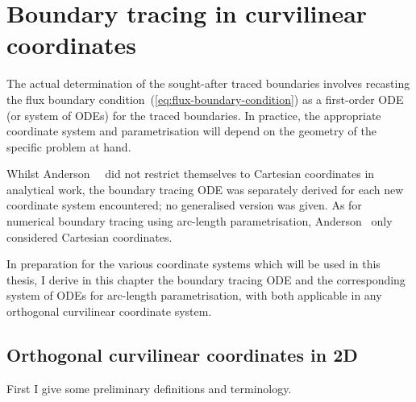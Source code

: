\chapter{Boundary tracing in curvilinear coordinates}
\label{ch:curvilinear}

The actual determination of the sought-after traced boundaries involves
recasting the flux boundary condition~(\ref{eq:flux-boundary-condition})
as a first-order ODE (or system of ODEs) for the traced boundaries.
In practice, the appropriate coordinate system and parametrisation
will depend on the geometry of the specific problem at hand.

Whilst Anderson~\etal~\cite{%
  anderson-2007-boundary-tracing-i-theory,%
  anderson-2007-boundary-tracing-ii-applications%
}
did not restrict themselves to Cartesian coordinates in analytical work,
the boundary tracing ODE was separately derived
for each new coordinate system encountered;
no generalised version was given.
As for numerical boundary tracing using arc-length parametrisation,
Anderson~\cite{anderson-2002-thesis-boundary-tracing-pdes}
only considered Cartesian coordinates.

In preparation for the various coordinate systems
which will be used in this thesis,
I derive in this chapter the boundary tracing ODE
and the corresponding system of ODEs for arc-length parametrisation,
with both applicable in any orthogonal curvilinear coordinate system.

\section{Orthogonal curvilinear coordinates in 2D}
\label{sec:curvilinear.orthogonal}

First I give some preliminary definitions and terminology.

